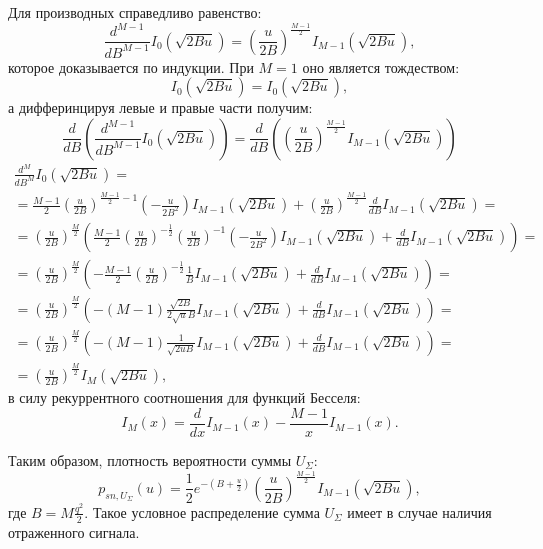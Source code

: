 \documentclass[a4paper,12pt]{article}
\newcommand{\fd}[1]{ \frac{d}{d #1}}
\newcommand{\md}[2]{ \frac{d^{#1}}{d #2^{#1}}}
\begin{document}
    Для производных справедливо равенство:
    \[
        \md{M-1}{B} I_0 \left ( \sqrt{2 B u} \right ) = \left ( \frac{u}{2B} \right )^\frac{M-1}{2} I_{M-1} \left ( \sqrt {2 B u} \right ) ,
    \]
    которое доказывается по индукции. При $M=1$ оно является тождеством:
    \[
        I_0 \left ( \sqrt{2 B u} \right ) = I_0 \left ( \sqrt {2 B u} \right ) ,
    \]
    а дифферинцируя левые и правые части получим:
    \[
        \fd{B} \left( \md{M-1}{B} I_0 \left ( \sqrt{2 B u} \right ) \right) = \fd{B} \left( \left ( \frac{u}{2B} \right )^\frac{M-1}{2} I_{M-1} \left ( \sqrt {2 B u} \right ) \right)
    \]
    \begin{multline*}
        \md{M}{B} I_0 \left ( \sqrt{2 B u} \right ) = \\
        = \frac{M-1}{2} \left ( \frac{u}{2 B} \right )^{\frac{M-1}{2} - 1} \left ( - \frac{u}{2 B^2} \right ) I_{M-1} \left ( \sqrt {2 B u} \right ) + \left( \frac{u}{2B} \right)^\frac{M-1}{2} \fd{B} I_{M-1} \left( \sqrt {2 B u} \right) = \\
        = \left ( \frac{u}{2 B} \right )^\frac{M}{2} \left ( \frac{M-1}{2} \left ( \frac{u}{2 B} \right )^{-\frac{1}{2}} \left ( \frac{u}{2 B} \right )^{-1} \left ( - \frac{u}{2 B^2} \right ) I_{M-1} \left ( \sqrt {2 B u} \right ) + \fd{B} I_{M-1} \left( \sqrt {2 B u} \right ) \right ) = \\
        = \left ( \frac{u}{2 B} \right )^\frac{M}{2} \left ( - \frac{M-1}{2} \left ( \frac{u}{2 B} \right )^{-\frac{1}{2}} \frac{1}{B} I_{M-1} \left ( \sqrt {2 B u} \right ) + \fd{B} I_{M-1} \left( \sqrt {2 B u} \right ) \right ) = \\
        = \left ( \frac{u}{2 B} \right )^\frac{M}{2} \left ( - (M-1) \frac{\sqrt{2 B}}{2 \sqrt{u} B} I_{M-1} \left ( \sqrt {2 B u} \right ) + \fd{B} I_{M-1} \left( \sqrt {2 B u} \right ) \right ) = \\
        = \left ( \frac{u}{2 B} \right )^\frac{M}{2} \left ( - (M-1) \frac{1}{\sqrt{2 u B}} I_{M-1} \left ( \sqrt {2 B u} \right ) + \fd{B} I_{M-1} \left( \sqrt {2 B u} \right ) \right ) = \\
        = \left ( \frac{u}{2 B} \right )^\frac{M}{2} I_M \left ( \sqrt{2 B u}\right ) ,
    \end{multline*}
    в силу рекуррентного соотношения для функций Бесселя:
    \[
        I_M(x) = \fd{x} I_{M-1}(x) - \frac{M-1}{x} I_{M-1}(x) .
    \]

    Таким образом, плотность вероятности суммы $U_\Sigma$:
    \[
        p_{sn,U_\Sigma}(u) = \frac{1}{2} e^{- \left ( B + \frac{u}{2} \right )} \left ( \frac{u}{2 B} \right )^\frac{M-1}{2} I_{M-1} \left ( \sqrt{2 B u}\right ) ,
    \]
    где $B = M \frac{q^2}{2}$. Такое условное распределение сумма $U_\Sigma$ имеет в случае наличия отраженного сигнала.
\end{document}
